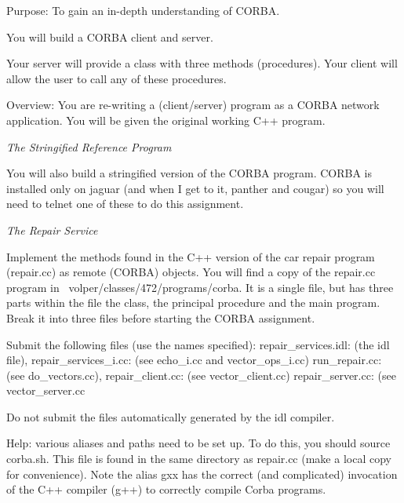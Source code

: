 

\parindent 0pt

Purpose: To gain an in-depth understanding of
CORBA.

You will build a CORBA client and server.

Your server will provide a class with three methods (procedures).
Your client will allow the user to call any of these procedures.

Overview: You are re-writing a (client/server) program as
a CORBA network application.
You will be given the original working C++ program.

{\it The Stringified Reference Program} 

You will also build a stringified version of the CORBA program.
CORBA is installed only on jaguar (and when I get to it, panther and cougar)
so you will need to telnet one of these to do this assignment.

{\it The Repair Service}

Implement the methods found in the C++ version of the car repair program
({\ltt{}repair.cc}) as remote (CORBA) objects.
You will find a copy of the {\ltt{}repair.cc} program in
{\ltt{}~volper/classes/472/programs/corba}.
It is a single file, but has three parts within the file
the class, the principal procedure and the main program.
Break it into three files before starting the CORBA assignment.

Submit the following files (use the names specified):
\hfill\break
{\ltt{}repair_services.idl}: (the idl file), 
\hfill\break
{\ltt{}repair_services_i.cc}: (see {\ltt{}echo_i.cc} and {\ltt{}vector_ops_i.cc})
\hfill\break
{\ltt{}run_repair.cc}: (see {\ltt{}do_vectors.cc}),
\hfill\break
{\ltt{}repair_client.cc}: (see {\ltt{}vector_client.cc})
\hfill\break
{\ltt{}repair_server.cc}: (see {\ltt{}vector_server.cc} 

Do not submit the files automatically generated by the idl compiler.

Help: various aliases and paths need to be set up. To do this,
you should {\ltt{}source corba.sh}. This file is found in the
same directory as {\ltt{}repair.cc} (make a local copy for convenience).
Note the alias {\ltt{}gxx} has the correct (and complicated) invocation
of the {\ltt{}C++} compiler ({\ltt{}g++}) to correctly compile Corba programs.

\bye
